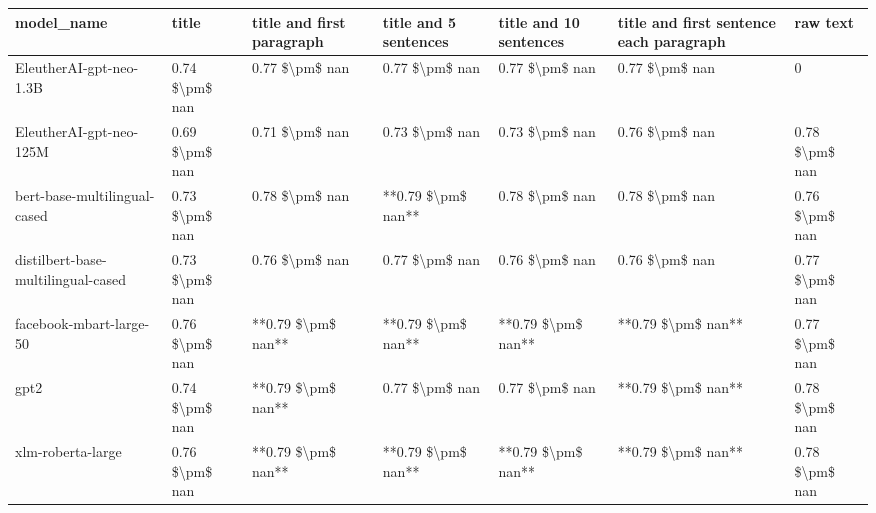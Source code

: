 \begin{tabular}{lllllll}
\toprule
                        model\_name &          title & title and first paragraph & title and 5 sentences & title and 10 sentences & title and first sentence each paragraph &       raw text \\
\midrule
           EleutherAI-gpt-neo-1.3B & 0.74 \$\textbackslash pm\$ nan &            0.77 \$\textbackslash pm\$ nan &        0.77 \$\textbackslash pm\$ nan &         0.77 \$\textbackslash pm\$ nan &                          0.77 \$\textbackslash pm\$ nan &              0 \\
           EleutherAI-gpt-neo-125M & 0.69 \$\textbackslash pm\$ nan &            0.71 \$\textbackslash pm\$ nan &        0.73 \$\textbackslash pm\$ nan &         0.73 \$\textbackslash pm\$ nan &                          0.76 \$\textbackslash pm\$ nan & 0.78 \$\textbackslash pm\$ nan \\
      bert-base-multilingual-cased & 0.73 \$\textbackslash pm\$ nan &            0.78 \$\textbackslash pm\$ nan &    **0.79 \$\textbackslash pm\$ nan** &         0.78 \$\textbackslash pm\$ nan &                          0.78 \$\textbackslash pm\$ nan & 0.76 \$\textbackslash pm\$ nan \\
distilbert-base-multilingual-cased & 0.73 \$\textbackslash pm\$ nan &            0.76 \$\textbackslash pm\$ nan &        0.77 \$\textbackslash pm\$ nan &         0.76 \$\textbackslash pm\$ nan &                          0.76 \$\textbackslash pm\$ nan & 0.77 \$\textbackslash pm\$ nan \\
           facebook-mbart-large-50 & 0.76 \$\textbackslash pm\$ nan &        **0.79 \$\textbackslash pm\$ nan** &    **0.79 \$\textbackslash pm\$ nan** &     **0.79 \$\textbackslash pm\$ nan** &                      **0.79 \$\textbackslash pm\$ nan** & 0.77 \$\textbackslash pm\$ nan \\
                              gpt2 & 0.74 \$\textbackslash pm\$ nan &        **0.79 \$\textbackslash pm\$ nan** &        0.77 \$\textbackslash pm\$ nan &         0.77 \$\textbackslash pm\$ nan &                      **0.79 \$\textbackslash pm\$ nan** & 0.78 \$\textbackslash pm\$ nan \\
                 xlm-roberta-large & 0.76 \$\textbackslash pm\$ nan &        **0.79 \$\textbackslash pm\$ nan** &    **0.79 \$\textbackslash pm\$ nan** &     **0.79 \$\textbackslash pm\$ nan** &                      **0.79 \$\textbackslash pm\$ nan** & 0.78 \$\textbackslash pm\$ nan \\
\bottomrule
\end{tabular}
